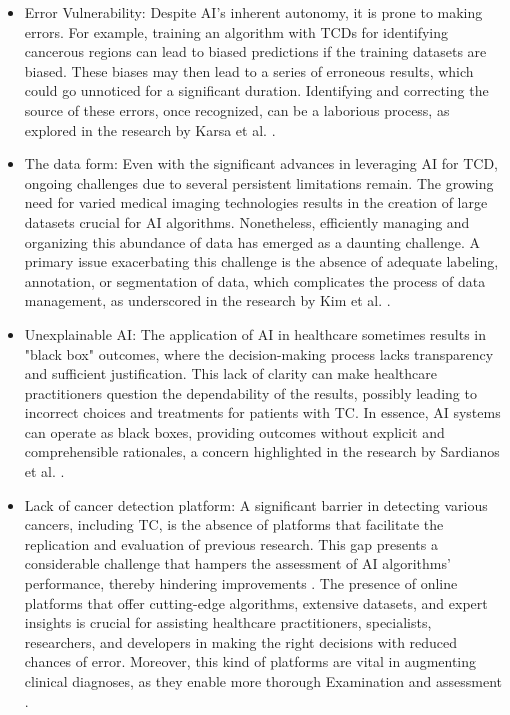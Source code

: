 \documentclass[a4paper,fleqn]{cas-sc}
\begin{document}
\begin{itemize}[leftmargin=*]
\item Error Vulnerability: Despite \ac{AI}'s inherent autonomy, it is prone to making errors. For example, training an algorithm with \acp{TCD} for identifying cancerous regions can lead to biased predictions if the training datasets are biased. These biases may then lead to a series of erroneous results, which could go unnoticed for a significant duration. Identifying and correcting the source of these errors, once recognized, can be a laborious process, as explored in the research by Karsa et al. \cite{karsa2020optimized}.

\item The data form: Even with the significant advances in leveraging \ac{AI} for \ac{TCD}, ongoing challenges due to several persistent limitations remain. The growing need for varied medical imaging technologies results in the creation of large datasets crucial for \ac{AI} algorithms. Nonetheless, efficiently managing and organizing this abundance of data has emerged as a daunting challenge. A primary issue exacerbating this challenge is the absence of adequate labeling, annotation, or segmentation of data, which complicates the process of data management, as underscored in the research by Kim et al. \cite{kim2022second}.

\item Unexplainable \ac{AI}: The application of \ac{AI} in healthcare sometimes results in "black box" outcomes, where the decision-making process lacks transparency and sufficient justification. This lack of clarity can make healthcare practitioners question the dependability of the results, possibly leading to incorrect choices and treatments for patients with TC. In essence, \ac{AI} systems can operate as black boxes, providing outcomes without explicit and comprehensible rationales, a concern highlighted in the research by Sardianos et al. \cite{sardianos2021emergence}.


\item Lack of cancer detection platform: A significant barrier in detecting various cancers, including TC, is the absence of platforms that facilitate the replication and evaluation of previous research. This gap presents a considerable challenge that hampers the assessment of \ac{AI} algorithms' performance, thereby hindering improvements \cite{abdolali2020automated}. The presence of online platforms that offer cutting-edge algorithms, extensive datasets, and expert insights is crucial for assisting healthcare practitioners, specialists, researchers, and developers in making the right decisions with reduced chances of error. Moreover, this kind of platforms are vital in augmenting clinical diagnoses, as they enable more thorough Examination and assessment \cite{masuda2021machine}.


\end{itemize}
\end{document}

